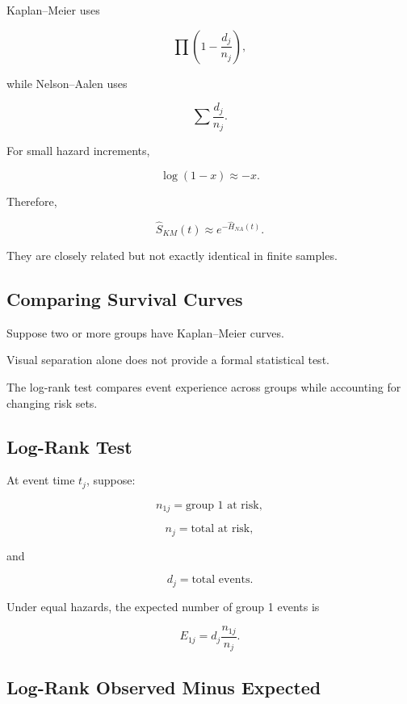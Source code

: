Kaplan--Meier uses

\[
\prod
\left(
1-\frac{d_j}{n_j}
\right),
\]

while Nelson--Aalen uses

\[
\sum
\frac{d_j}{n_j}.
\]

For small hazard increments,

\[
\log(1-x)
\approx
-x.
\]

Therefore,

\[
\boxed{
\widehat{S}_{KM}(t)
\approx
e^{-\widehat{H}_{NA}(t)}.
}
\]

They are closely related but not exactly identical in finite samples.

\subsection{Comparing Survival Curves}
\label{subsec:comparing-survival-curves}

Suppose two or more groups have Kaplan--Meier curves.

Visual separation alone does not provide a formal statistical test.

The log-rank test compares event experience across groups while
accounting for changing risk sets.

\subsection{Log-Rank Test}
\label{subsec:log-rank-test}

At event time \(t_j\), suppose:

\[
n_{1j}
=
\text{group 1 at risk},
\]

\[
n_j
=
\text{total at risk},
\]

and

\[
d_j
=
\text{total events}.
\]

Under equal hazards, the expected number of group 1 events is

\[
\boxed{
E_{1j}
=
d_j
\frac{
n_{1j}
}{
n_j
}.
}
\]

\subsection{Log-Rank Observed Minus Expected}
\label{subsec:log-rank-observed-expected}

